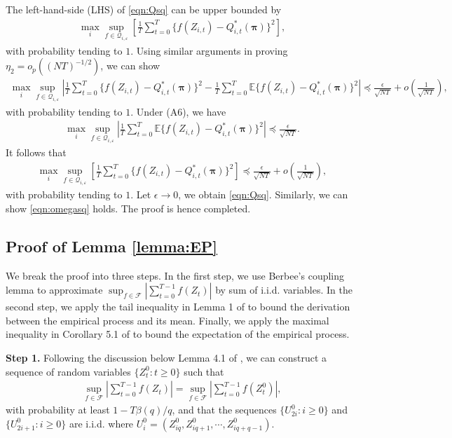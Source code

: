 \documentclass{article}
\newcommand{\Mean}{{\mathbb{E}}}
\begin{document}
The left-hand-side (LHS) of \eqref{eqn:Qsq} can be upper bounded by
\begin{eqnarray*}
	\max_i \sup_{f\in \mathcal{Q}_{i,\varepsilon}} \left[\frac{1}{T}\sum_{t=0}^T \{f(Z_{i,t})-Q_{i,t}^*(\bm{\pi})\}^2 \right],
\end{eqnarray*}
with probability tending to $1$. 
Using similar arguments in proving $\eta_2=o_p((NT)^{-1/2})$, we can show
\begin{eqnarray*}
	\max_i \sup_{f\in \mathcal{Q}_{i,\varepsilon}} \left|\frac{1}{T}\sum_{t=0}^T \{f(Z_{i,t})-Q_{i,t}^*(\bm{\pi})\}^2-\frac{1}{T}\sum_{t=0}^T \Mean \{f(Z_{i,t})-Q_{i,t}^*(\bm{\pi})\}^2  \right|\preceq \frac{\epsilon}{\sqrt{NT}}+o\left(\frac{1}{\sqrt{NT}}\right),
\end{eqnarray*} 
with probability tending to $1$. Under (A6), we have
\begin{eqnarray*}
	\max_i \sup_{f\in \mathcal{Q}_{i,\varepsilon}} \left|\frac{1}{T}\sum_{t=0}^T \Mean \{f(Z_{i,t})-Q_{i,t}^*(\bm{\pi})\}^2  \right|\preceq \frac{\epsilon}{\sqrt{NT}}.
\end{eqnarray*} 
It follows that 
\begin{eqnarray*}
	\max_i \sup_{f\in \mathcal{Q}_{i,\varepsilon}} \left[\frac{1}{T}\sum_{t=0}^T \{f(Z_{i,t})-Q_{i,t}^*(\bm{\pi})\}^2 \right]\preceq \frac{\epsilon}{\sqrt{NT}}+o\left(\frac{1}{\sqrt{NT}}\right),
\end{eqnarray*}
with probability tending to $1$. Let $\epsilon\to 0$, we obtain \eqref{eqn:Qsq}. Similarly, we can show \eqref{eqn:omegasq} holds. The proof is hence completed. 

\subsection{Proof of Lemma \ref{lemma:EP}}
We break the proof into three steps. In the first step, we use Berbee's coupling lemma \citep[see Lemma 4.1 in][]{Dedecker2002} to approximate $\sup_{f\in \mathcal{F}}|\sum_{t=0}^{T-1} f(Z_t)|$ by sum of i.i.d. variables. In the second step, we apply the tail inequality in Lemma 1 of \cite{Adam2008} to bound the derivation between the empirical process and its mean. Finally, we apply the maximal inequality in Corollary 5.1 of \cite{cherno2014} to bound the expectation of the empirical process. 

\textbf{Step 1.} Following the discussion below Lemma 4.1 of \cite{Dedecker2002},  we can construct a sequence of random variables $\{Z_{t}^0:t\ge 0\}$ such that
\begin{eqnarray}\label{eqn:step1eq1}
	\sup_{f\in \mathcal{F}}\left|\sum_{t=0}^{T-1} f(Z_t)\right|=\sup_{f\in \mathcal{F}}\left|\sum_{t=0}^{T-1} f(Z_t^0)\right|,
\end{eqnarray}
with probability at least $1-T\beta(q)/q$, and that the sequences $\{U_{2i}^0:i\ge 0\}$ and $\{U_{2i+1}^0:i\ge 0\}$ are i.i.d. where $U_i^0=(Z_{iq}^0,Z_{iq+1}^0,\cdots,Z_{iq+q-1}^0)$. 
\end{document}
